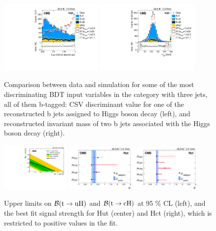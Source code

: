 \documentclass{PoS}
\begin{document}
\begin{figure}[htb]
\centering
\includegraphics[width=0.45\textwidth]{figures/CMS-TOP-17-003_Figure_002-b}
\includegraphics[width=0.45\textwidth]{figures/CMS-TOP-17-003_Figure_002-c}
\caption{
  Comparison between data and simulation for some of the most discriminating BDT
  input variables in the category with three jets, all of them b-tagged: CSV
  discriminant value for one of the reconstructed b jets assigned to Higgs boson
  decay (left), and reconstructed invariant mass of two b jets associated with
  the Higgs boson decay (right).
}
\label{fig:TOP-17-003_Figure_002}
\end{figure}


\begin{figure}[htb]
\centering
\includegraphics[width=0.3\textwidth]{figures/CMS-TOP-17-003_Figure_006}
\includegraphics[width=0.3\textwidth]{figures/CMS-TOP-17-003_Figure_007-a}
\includegraphics[width=0.3\textwidth]{figures/CMS-TOP-17-003_Figure_007-b}
\caption{
  Upper limits on ${\cal B}({\rm t \to uH})$ and ${\cal B}({\rm t \to cH})$ at
  95 \% CL (left), and the best fit signal strength for Hut (center) and Hct
  (right), which is restricted to positive values in the fit.
}
\label{fig:TOP-17-003_Figures_006-007}
\end{figure}
\end{document}
